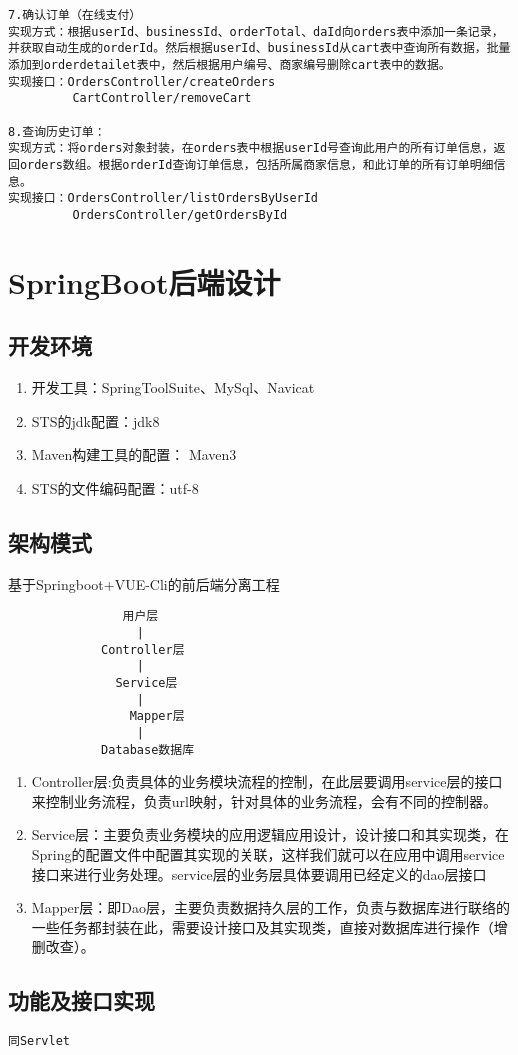 \begin{verbatim}
7.确认订单（在线支付）
实现方式：根据userId、businessId、orderTotal、daId向orders表中添加一条记录，并获取自动生成的orderId。然后根据userId、businessId从cart表中查询所有数据，批量添加到orderdetailet表中，然后根据用户编号、商家编号删除cart表中的数据。
实现接口：OrdersController/createOrders   
         CartController/removeCart

8.查询历史订单：
实现方式：将orders对象封装，在orders表中根据userId号查询此用户的所有订单信息，返回orders数组。根据orderId查询订单信息，包括所属商家信息，和此订单的所有订单明细信息。
实现接口：OrdersController/listOrdersByUserId  
         OrdersController/getOrdersById
\end{verbatim}


\section{SpringBoot后端设计}

\subsection{开发环境}

\begin{enumerate}
    \item 开发工具：SpringToolSuite、MySql、Navicat
    \item STS的jdk配置：jdk8
    \item Maven构建工具的配置： Maven3
    \item STS的文件编码配置：utf-8
\end{enumerate}

\subsection{架构模式}
基于Springboot+VUE-Cli的前后端分离工程

\begin{verbatim}
                用户层
                  | 
             Controller层
                  |
               Service层
                  |
                 Mapper层
                  |
             Database数据库
\end{verbatim}

\begin{enumerate}
\item Controller层:负责具体的业务模块流程的控制，在此层要调用service层的接口来控制业务流程，负责url映射，针对具体的业务流程，会有不同的控制器。
\item Service层：主要负责业务模块的应用逻辑应用设计，设计接口和其实现类，在Spring的配置文件中配置其实现的关联，这样我们就可以在应用中调用service接口来进行业务处理。service层的业务层具体要调用已经定义的dao层接口
\item Mapper层：即Dao层，主要负责数据持久层的工作，负责与数据库进行联络的一些任务都封装在此，需要设计接口及其实现类，直接对数据库进行操作（增删改查）。
\end{enumerate}

\subsection{功能及接口实现}
\begin{verbatim}
同Servlet 
    \end{verbatim}

